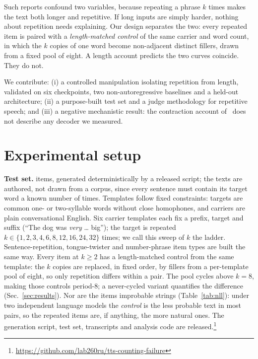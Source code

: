 \documentclass{article}
\begin{document}
Such reports confound two variables, because repeating a phrase $k$ times
makes the text both longer and repetitive. If long inputs are simply harder, nothing about repetition needs
explaining. Our design separates the two:
every repeated item is paired with a \emph{length-matched control} of the
same carrier and word count, in which the $k$ copies of one
word become non-adjacent distinct fillers, drawn from a fixed pool of
eight. A length account predicts the two curves
coincide. They do not.

We contribute: (i) a controlled manipulation isolating repetition
from length, validated on six checkpoints, two non-autoregressive
baselines and a held-out architecture; (ii) a purpose-built test set and a judge methodology for repetitive
speech; and (iii) a negative mechanistic result: the contraction
account of~\cite{viakhirev2026dispersion} does not describe any decoder
we measured.

\section{Experimental setup}
\label{sec:method}

\textbf{Test set.}
\NStimuli{} items, generated deterministically by a released script; the
texts are authored, not drawn from a corpus, since every sentence must
contain its target word a known number of times. Templates follow fixed
constraints: targets are common one- or two-syllable words
without close homophones, and carriers are plain conversational
English. Six carrier templates each fix a prefix, target and
suffix (``The dog was \emph{very} \dots{} big''); the target is repeated
$k \in \{1,2,3,4,6,8,12,16,24,32\}$ times; we call this sweep of $k$
the ladder. Sentence-repetition, tongue-twister and number-phrase item
types are built the same way. Every item at
$k\ge2$ has a length-matched control from the same template: the $k$
copies are replaced, in fixed order, by fillers from a per-template pool
of eight, so only repetition differs within a pair. The pool cycles above $k{=}8$, making those
controls period-8; a never-cycled variant quantifies the difference
(Sec.~\ref{sec:results}). Nor are the items improbable
strings (Table~\ref{tab:nll}): under two independent language models the
\emph{control} is the less probable text in most pairs, so the repeated
items are, if anything, the more natural ones. The generation script, test set, transcripts and analysis code are released.\footnote{\url{https://github.com/lab260ru/tts-counting-failure}}
\end{document}
